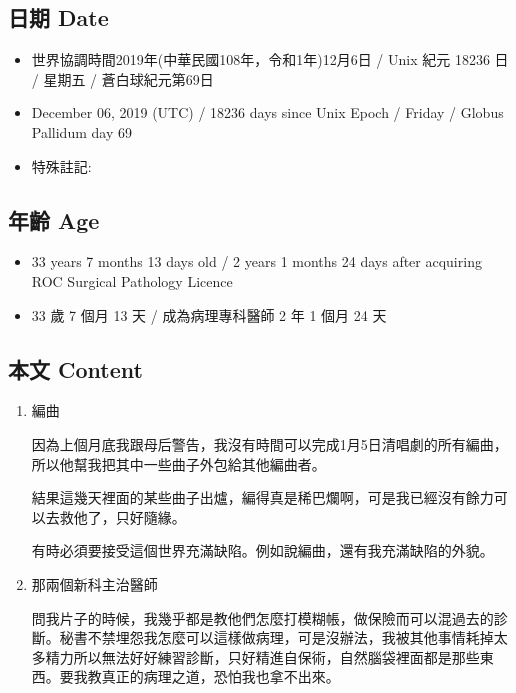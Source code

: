 \documentclass[a5paper, 12pt
]{book}
\providecommand{\tightlist}{%
  \setlength{\itemsep}{0pt}\setlength{\parskip}{0pt}}
\begin{document}
\hypertarget{ux65e5ux671f-date-5}{%
\subsection{日期 Date}\label{ux65e5ux671f-date-5}}

\begin{itemize}
\tightlist
\item
  世界協調時間2019年(中華民國108年，令和1年)12月6日 / Unix 紀元 18236 日
  / 星期五 / 蒼白球紀元第69日
\item
  December 06, 2019 (UTC) / 18236 days since Unix Epoch / Friday /
  Globus Pallidum day 69
\item
  特殊註記:
\end{itemize}

\hypertarget{ux5e74ux9f61-age-5}{%
\subsection{年齡 Age}\label{ux5e74ux9f61-age-5}}

\begin{itemize}
\tightlist
\item
  33 years 7 months 13 days old / 2 years 1 months 24 days after
  acquiring ROC Surgical Pathology Licence
\item
  33 歲 7 個月 13 天 / 成為病理專科醫師 2 年 1 個月 24 天
\end{itemize}

\hypertarget{ux672cux6587-content-5}{%
\subsection{本文 Content}\label{ux672cux6587-content-5}}

\begin{enumerate}
\def\labelenumi{\arabic{enumi}.}
\item
  編曲

  因為上個月底我跟母后警告，我沒有時間可以完成1月5日清唱劇的所有編曲，所以他幫我把其中一些曲子外包給其他編曲者。

  結果這幾天裡面的某些曲子出爐，編得真是稀巴爛啊，可是我已經沒有餘力可以去救他了，只好隨緣。

  有時必須要接受這個世界充滿缺陷。例如說編曲，還有我充滿缺陷的外貌。
\item
  那兩個新科主治醫師

  問我片子的時候，我幾乎都是教他們怎麼打模糊帳，做保險而可以混過去的診斷。秘書不禁埋怨我怎麼可以這樣做病理，可是沒辦法，我被其他事情耗掉太多精力所以無法好好練習診斷，只好精進自保術，自然腦袋裡面都是那些東西。要我教真正的病理之道，恐怕我也拿不出來。
\end{enumerate}
\end{document}
